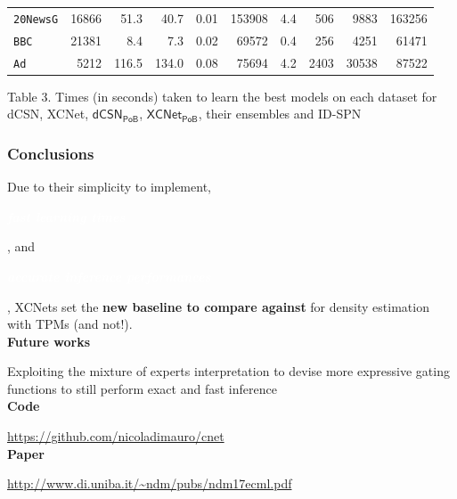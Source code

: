 \documentclass[xcolor={usenames,dvipsnames,svgnames}, compress]{beamer}
\newcommand{\highlighttext}[2][yellow]{{\colorbox{#1}{\strut\textcolor{white}{#2}}}}
\begin{document}
\begin{frame}[t]
\begin{table}[t]
\begin{tabular}{l rrr r r r r r r}
    \texttt{20NewsG}&16866&51.3&40.7&	0.01&153908&4.4& 506& 9883&163256\\ 
    \texttt{BBC}&21381&8.4&7.3&	0.02&69572&0.4& 256& 4251 &61471\\ 
    \texttt{Ad}&5212&116.5&134.0&	0.08&75694&4.2&2403 & 30538 &87522\\ 
    \bottomrule
  \end{tabular}
  \label{tab:exptimes}
\end{table}\vspace{-10pt}
\hspace{30pt}\begin{minipage}{0.8\linewidth}
 \tiny Table 3. Times (in seconds) taken to learn the best models on each dataset
for \textsf{dCSN}, \textsf{XCNet}, $\mathsf{dCSN_{PoB}}$, $\mathsf{XCNet_{PoB}}$, their ensembles
and \textsf{ID-SPN}
\end{minipage}
\end{frame}

\begin{frame}[t]
  \frametitle{Conclusions}
  \small
  

  Due to their simplicity to implement, \highlighttext[gold4]{\textbf{\emph{fast learning times}}}, and \highlighttext[lacamlilac]{\emph{\textbf{accurate
inference performances}}}, XCNets set the \textbf{new baseline to compare against} for density
estimation with TPMs (and not!).\\[20pt]

\textbf{\normalsize Future works}\par 
Exploiting the mixture of
experts interpretation to devise more expressive gating functions
to still perform exact and fast inference\\[20pt]

\textbf{\normalsize Code}\par 
\url{https://github.com/nicoladimauro/cnet}\\[10pt]

\textbf{\normalsize Paper}\par 
\url{http://www.di.uniba.it/~ndm/pubs/ndm17ecml.pdf}

\end{frame}
\end{document}
